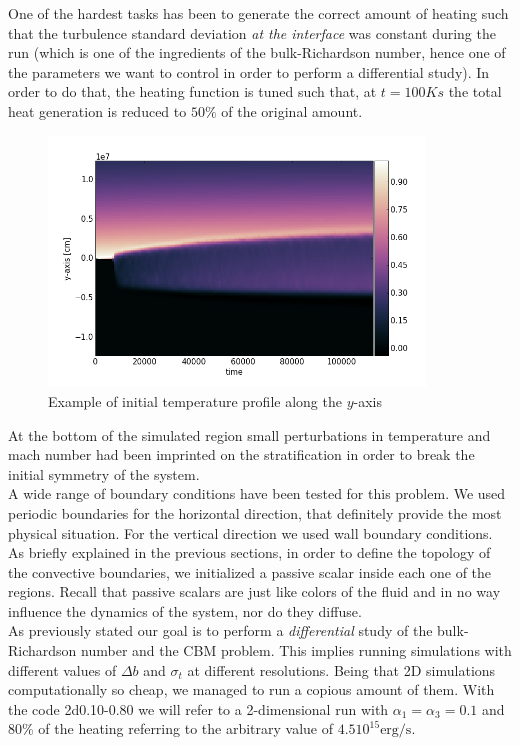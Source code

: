 One of the hardest tasks has been to generate the correct amount of heating such that the turbulence standard deviation \textit{at the interface} was constant during the run (which is one of the ingredients of the bulk-Richardson number, hence one of the parameters we want to control in order to perform a differential study). In order to do that, the heating function is tuned such that, at $t=100K s$ the total heat generation is reduced to $50 \%$ of the original amount.\\ 
\begin{figure}[t]
\centering
\includegraphics[width=10cm]{./img/tempprofile}
\caption{Example of initial temperature profile along the $y$-axis}
\label{fig:tempprofile}
\centering
\end{figure}
At the bottom of the simulated region small perturbations in temperature and mach number had been imprinted on the stratification in order to break the initial symmetry of the system.\\
A wide range of boundary conditions have been tested for this problem. We used periodic boundaries for the horizontal direction, that definitely provide the most physical situation. For the vertical direction we used wall boundary conditions.\\ 
As briefly explained in the previous sections, in order to define the topology of the convective boundaries, we initialized a passive scalar inside each one of the regions. Recall that passive scalars are just like colors of the fluid and in no way influence the dynamics of the system, nor do they diffuse.\\
As previously stated our goal is to perform a \textit{differential} study of the bulk-Richardson number and the CBM problem. This implies running simulations with different values of $\Delta b$ and $\sigma_t$ at different resolutions. Being that 2D simulations computationally so cheap, we managed to run a copious amount of them. With the code 2d0.10-0.80 we will refer to a 2-dimensional run with $\alpha_{1} = \alpha_{3}=0.1$ and $80 \%$ of the heating referring to the arbitrary value of $4.5 10^{15} \mathrm{erg/s}$.\\ 
